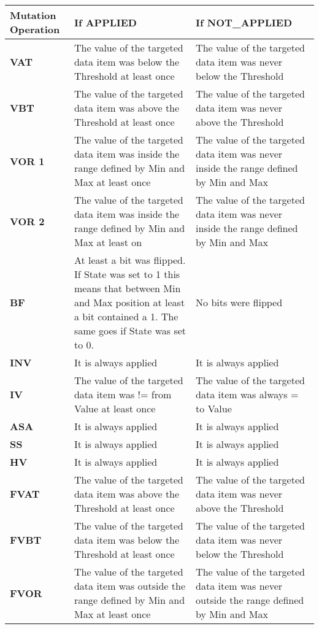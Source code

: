 \begin{table}[]
\begin{tabular}{|p{2cm}|p{5cm}|p{5cm}}
\hline
\textbf{Mutation Operation} & \textbf{If APPLIED} & \textbf{If NOT\_APPLIED} \\ \hline
\textbf{VAT} & The value of the targeted data item was below the Threshold at least once & The value of the targeted data item was never below the Threshold \\ \hline
\textbf{VBT} & The value of the targeted data item was above the Threshold at least once & The value of the targeted data item was never above the Threshold \\ \hline
\textbf{VOR 1} & The value of the targeted data item was inside the range defined by Min and Max at least once & The value of the targeted data item was never inside the range defined by Min and Max \\ \hline
\textbf{VOR 2} & The value of the targeted data item was inside the range defined by Min and Max at least on & The value of the targeted data item was never inside the range defined by Min and Max \\ \hline
\textbf{BF} & At least a bit was flipped. If State was set to 1 this means that between Min and Max position at least a bit contained a 1. The same goes if State was set to 0. & No bits were flipped \\ \hline
\textbf{INV} & It is always applied & It is always applied \\ \hline
\textbf{IV} & The value of the targeted data item was != from Value at least once & The value of the targeted data item was always = to Value \\ \hline
\textbf{ASA} & It is always applied & It is always applied \\ \hline
\textbf{SS} & It is always applied & It is always applied \\ \hline
\textbf{HV} & It is always applied & It is always applied \\ \hline
\textbf{FVAT} & The value of the targeted data item was above the Threshold at least once & The value of the targeted data item was never above the Threshold \\ \hline
\textbf{FVBT} & The value of the targeted data item was below the Threshold at least once & The value of the targeted data item was never below the Threshold \\ \hline
\textbf{FVOR} & The value of the targeted data item was outside the range defined by Min and Max at least once & The value of the targeted data item was never outside the range defined by Min and Max \\ \hline
\end{tabular}
\end{table}
